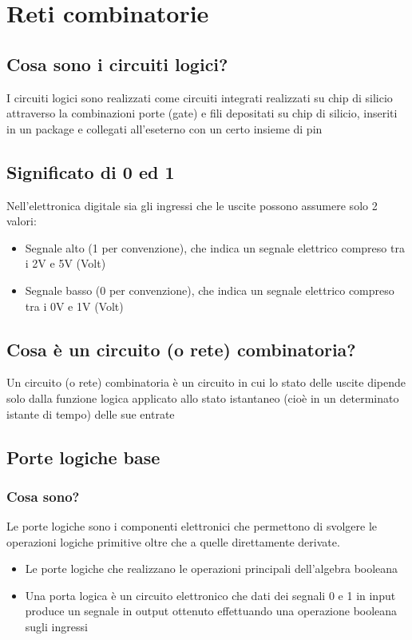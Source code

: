 \chapter{Reti combinatorie}
\section{Cosa sono i circuiti logici?}
I circuiti logici sono realizzati come circuiti integrati realizzati su chip di silicio attraverso la combinazioni porte (gate) e fili depositati su chip di silicio, inseriti in un package e collegati all'eseterno con un certo insieme di pin

\section{Significato di 0 ed 1}
Nell'elettronica digitale sia gli ingressi che le uscite possono assumere solo 2 valori:
\begin{itemize}
    \item Segnale alto (1 per convenzione), che indica un segnale elettrico compreso tra i 2V e 5V (Volt)
    \item Segnale basso (0 per convenzione), che indica un segnale elettrico compreso tra i 0V e 1V (Volt)
\end{itemize}

\section{Cosa è un circuito (o rete) combinatoria?}
Un circuito (o rete) combinatoria è un circuito in cui lo stato delle uscite dipende solo dalla funzione logica applicato allo stato istantaneo (cioè in un determinato istante di tempo) delle sue entrate

\section{Porte logiche base}
\subsection{Cosa sono?}
Le porte logiche sono i componenti elettronici che permettono di svolgere le operazioni logiche primitive oltre che a quelle direttamente derivate.

\begin{itemize}
    \item Le porte logiche che realizzano le operazioni principali dell'algebra booleana
    \item Una porta logica è un circuito elettronico che dati dei segnali 0 e 1 in input produce un segnale in output ottenuto effettuando una operazione booleana sugli ingressi
\end{itemize}


